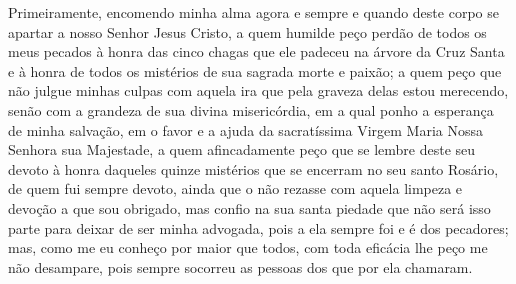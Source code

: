 \begin{linenumbers}
Primeiramente, encomendo minha alma agora e sempre e quando deste corpo
se apartar a nosso Senhor Jesus Cristo, a quem humilde peço perdão de
todos os meus pecados à honra das cinco chagas que ele padeceu na
árvore da Cruz Santa e à honra de todos os mistérios de sua sagrada
morte e paixão; a quem peço que não julgue minhas culpas com aquela ira
que pela graveza delas estou merecendo, senão com a grandeza de sua
divina misericórdia, em a qual ponho a esperança de minha salvação, em
o favor e a ajuda da sacratíssima Virgem Maria Nossa Senhora sua
Majestade, a quem afincadamente peço que se lembre deste seu devoto à
honra daqueles quinze mistérios que se encerram no seu santo Rosário,
de quem fui sempre devoto, ainda que o não rezasse com aquela limpeza e
devoção a que sou obrigado, mas confio na sua santa piedade que não
será isso parte para deixar de ser minha advogada, pois a ela sempre 
foi e é dos pecadores; mas, como me eu conheço por maior que todos, com
toda eficácia lhe peço me não desampare, pois sempre socorreu as
pessoas dos que por ela chamaram.


\end{linenumbers}
